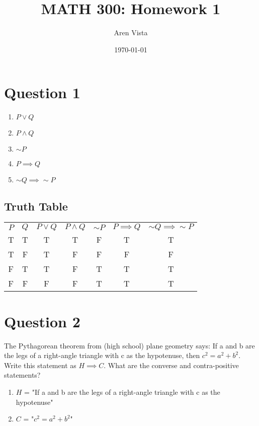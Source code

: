 \documentclass[11pt]{article}
\title{ MATH 300: Homework 1}
\author{ Aren Vista }
\date{\today}
\theoremstyle{plain}
\begin{document}
\maketitle	
\pagebreak



\section*{Question 1}
\begin{enumerate}
    \item $P \lor Q$
    \item $P \land Q$
    \item $\sim P$
    \item $P \implies Q$
    \item $\sim Q \implies \sim P$
\end{enumerate}

\subsection{Truth Table}
\begin{center}
\begin{tabular}{ c c c c c c c }
  $P$ & $Q$  & $P \lor Q$ & $P \land Q$ & $\sim P$ & $P \implies Q$ & $\sim Q \implies \sim P$ \\
  T & T & T & T & F & T & T\\ 
  T & F & T & F & F & F & F\\
  F & T & T & F & T & T & T\\
  F & F & F & F & T & T & T\\
\end{tabular}
\end{center}


\section*{Question 2}
The Pythagorean theorem from (high school) plane geometry says: If a and b are the legs of a right-angle triangle with c as the hypotenuse, then $c^2 = a^2 + b^2$. Write this statement as $H \implies C$. What are the converse and contra-positive statements?

\begin{enumerate}
    \item $H$ = "If a and b are the legs of a right-angle triangle with c as the hypotenuse"
    \item $C$ = "$c^2 = a^2 + b^2$"
\end {enumerate}
\end{document}
